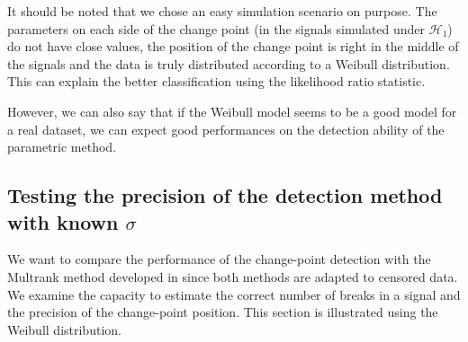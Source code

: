 It should be noted that we chose an easy simulation scenario on purpose. The parameters on each side of the change point (in the signals simulated under $\mathcal{H}_1$) do not have close values, the position of the change point is right in the middle of the signals and the data is truly distributed according to a Weibull distribution. This can explain the better classification using the likelihood ratio statistic. 

However, we can also say that if the Weibull model seems to be a good model for a real dataset, we can expect good performances on the detection ability of the parametric method. 


\subsection{Testing the precision of the detection method with known $\sigma$}\label{chp:4:4:2}

We want to compare the performance of the change-point detection with the Multrank method developed in \cite{lung2015} since both methods are adapted to censored data. We examine the capacity to estimate the correct number of breaks in a signal and the precision of the change-point position. This section is illustrated using the Weibull distribution.   

